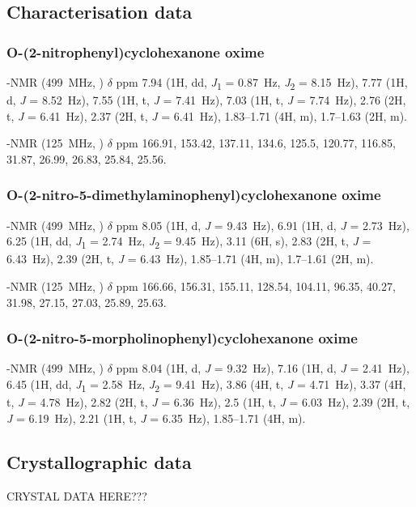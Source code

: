\begin{refsection}
\subsection{Characterisation data}

\subsubsection{O-(2-nitrophenyl)cyclohexanone oxime }

-NMR (499~MHz, ) $\delta$ ppm 7.94 (1H, dd, \textit{J}\textsubscript{1} = 0.87~Hz, \textit{J}\textsubscript{2} = 8.15~Hz), 7.77 (1H, d, \textit{J} = 8.52~Hz), 7.55 (1H, t, \textit{J} = 7.41~Hz), 7.03 (1H, t, \textit{J} = 7.74~Hz), 2.76 (2H, t, \textit{J} = 6.41~Hz), 2.37 (2H, t, \textit{J} = 6.41~Hz), 1.83--1.71 (4H, m), 1.7--1.63 (2H, m).

-NMR (125~MHz, ) $\delta$ ppm 166.91, 153.42, 137.11, 134.6, 125.5, 120.77, 116.85, 31.87, 26.99, 26.83, 25.84, 25.56.

\subsubsection{O-(2-nitro-5-dimethylaminophenyl)cyclohexanone oxime }

-NMR (499~MHz, ) $\delta$ ppm 8.05 (1H, d, \textit{J} = 9.43~Hz), 6.91 (1H, d, \textit{J} = 2.73~Hz), 6.25 (1H, dd, \textit{J}\textsubscript{1} = 2.74~Hz, \textit{J}\textsubscript{2} = 9.45~Hz), 3.11 (6H, s), 2.83 (2H, t, \textit{J} = 6.43~Hz), 2.39 (2H, t, \textit{J} = 6.43~Hz), 1.85--1.71 (4H, m), 1.7--1.61 (2H, m).

-NMR (125~MHz, ) $\delta$ ppm 166.66, 156.31, 155.11, 128.54, 104.11, 96.35, 40.27, 31.98, 27.15, 27.03, 25.89, 25.63.

\subsubsection{O-(2-nitro-5-morpholinophenyl)cyclohexanone oxime }

-NMR (499~MHz, ) $\delta$ ppm 8.04 (1H, d, \textit{J} = 9.32~Hz), 7.16 (1H, d, \textit{J} = 2.41~Hz), 6.45 (1H, dd, \textit{J}\textsubscript{1} = 2.58~Hz, \textit{J}\textsubscript{2} = 9.41~Hz), 3.86 (4H, t, \textit{J} = 4.71~Hz), 3.37 (4H, t, \textit{J} = 4.78~Hz), 2.82 (2H, t, \textit{J} = 6.36~Hz), 2.5 (1H, t, \textit{J} = 6.03~Hz), 2.39 (2H, t, \textit{J} = 6.19~Hz), 2.21 (1H, t, \textit{J} = 6.35~Hz), 1.85--1.71 (4H, m).

\subsection{Crystallographic data}

CRYSTAL DATA HERE???

\printbibliography[heading=subbibliography]
\end{refsection}